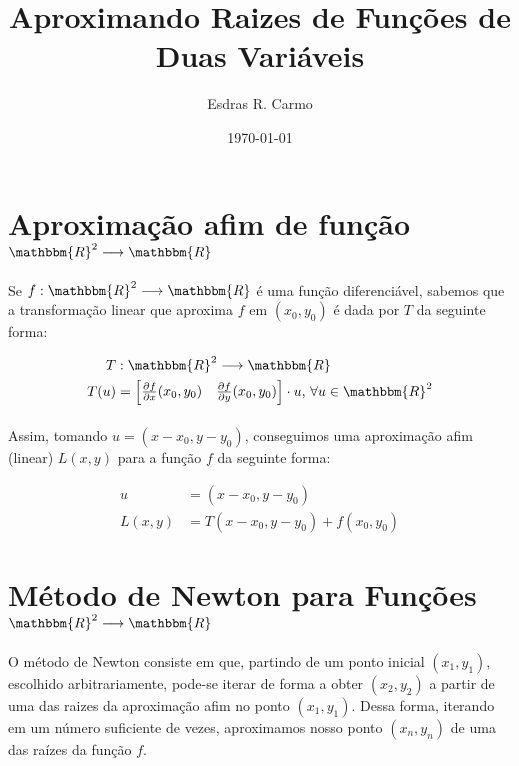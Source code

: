 \documentclass{article}
\author{Esdras R. Carmo}
\title{Aproximando Raizes de Funções de Duas Variáveis}
\date{\today}
\begin{document}
    \maketitle

    \section{Aproximação afim de função $\mathbbm{R}^2 \longrightarrow \mathbbm{R}$}
        \paragraph{}
        Se $f: \mathbbm{R}^2 \longrightarrow \mathbbm{R}$ é uma função diferenciável, sabemos que a transformação
        linear que aproxima $f$ em $(x_0, y_0)$ é dada por $T$ da seguinte forma:

        \begin{align*}
            T&: \mathbbm{R}^2 \longrightarrow \mathbbm{R}\\
            T(u) &= \left[\begin{matrix} \frac{\partial f}{\partial x} (x_0, y_0)&
                                         \frac{\partial f}{\partial y} (x_0, y_0)\end{matrix}\right] \cdot u \text{,  } \forall u \in \mathbbm{R}^2
        \end{align*}

        \paragraph{}
        Assim, tomando $u = (x - x_0, y - y_0)$, conseguimos uma aproximação afim (linear) $L(x, y)$ para a função $f$ da seguinte forma:

        \begin{align*}
            u &= (x - x_0, y - y_0)\\
            L(x, y) &= T(x - x_0, y - y_0) + f(x_0, y_0)
        \end{align*}

    \section{Método de Newton para Funções $\mathbbm{R}^2 \longrightarrow \mathbbm{R}$}
        \paragraph{}
        O método de Newton consiste em que, partindo de um ponto inicial $(x_1, y_1)$, escolhido arbitrariamente, pode-se iterar de forma a
        obter $(x_2, y_2)$ a partir de uma das raizes da aproximação afim no ponto $(x_1, y_1)$. Dessa forma, iterando em um número suficiente
        de vezes, aproximamos nosso ponto $(x_n, y_n)$ de uma das raízes da função $f$.
\end{document}
